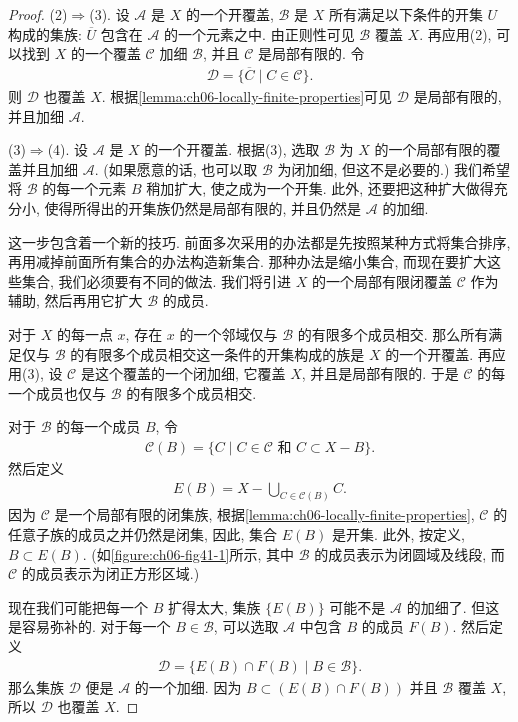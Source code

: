 \documentclass[../../main.tex]{subfiles}
\begin{document}
\begin{proof}
(2)$\Rightarrow$(3). 设 $\mathcal{A}$ 是 $X$ 的一个开覆盖, $\mathcal{B}$ 是 $X$ 所有满足以下条件的开集 $U$ 构成的集族: $\overline{U}$ 包含在 $\mathcal{A}$ 的一个元素之中. 由正则性可见 $\mathcal{B}$ 覆盖 $X$. 再应用(2), 可以找到 $X$ 的一个覆盖 $\mathcal{C}$ 加细 $\mathcal{B}$, 并且 $\mathcal{C}$ 是局部有限的. 令
\begin{align*}
\mathcal{D}=\{\overline{C}\mid C\in\mathcal{C}\}.
\end{align*}
则 $\mathcal{D}$ 也覆盖 $X$. 根据\cref{lemma:ch06-locally-finite-properties}可见 $\mathcal{D}$ 是局部有限的, 并且加细 $\mathcal{A}$.

(3)$\Rightarrow$(4). 设 $\mathcal{A}$ 是 $X$ 的一个开覆盖. 根据(3), 选取 $\mathcal{B}$ 为 $X$ 的一个局部有限的覆盖并且加细 $\mathcal{A}$. (如果愿意的话, 也可以取 $\mathcal{B}$ 为闭加细, 但这不是必要的.) 我们希望将 $\mathcal{B}$ 的每一个元素 $B$ 稍加扩大, 使之成为一个开集. 此外, 还要把这种扩大做得充分小, 使得所得出的开集族仍然是局部有限的, 并且仍然是 $\mathcal{A}$ 的加细.

这一步包含着一个新的技巧. 前面多次采用的办法都是先按照某种方式将集合排序, 再用减掉前面所有集合的办法构造新集合. 那种办法是缩小集合, 而现在要扩大这些集合, 我们必须要有不同的做法. 我们将引进 $X$ 的一个局部有限闭覆盖 $\mathcal{C}$ 作为辅助, 然后再用它扩大 $\mathcal{B}$ 的成员.

对于 $X$ 的每一点 $x$, 存在 $x$ 的一个邻域仅与 $\mathcal{B}$ 的有限多个成员相交. 那么所有满足仅与 $\mathcal{B}$ 的有限多个成员相交这一条件的开集构成的族是 $X$ 的一个开覆盖. 再应用(3), 设 $\mathcal{C}$ 是这个覆盖的一个闭加细, 它覆盖 $X$, 并且是局部有限的. 于是 $\mathcal{C}$ 的每一个成员也仅与 $\mathcal{B}$ 的有限多个成员相交.

对于 $\mathcal{B}$ 的每一个成员 $B$, 令
\begin{align*}
\mathcal{C}(B)=\{C\mid C\in\mathcal{C}\text{ 和 }C\subset X-B\}.
\end{align*}
然后定义
\begin{align*}
E(B)=X-\bigcup_{C\in\mathcal{C}(B)}C.
\end{align*}
因为 $\mathcal{C}$ 是一个局部有限的闭集族, 根据\cref{lemma:ch06-locally-finite-properties}, $\mathcal{C}$ 的任意子族的成员之并仍然是闭集, 因此, 集合 $E(B)$ 是开集. 此外, 按定义, $B\subset E(B)$. (如\cref{figure:ch06-fig41-1}所示, 其中 $\mathcal{B}$ 的成员表示为闭圆域及线段, 而 $\mathcal{C}$ 的成员表示为闭正方形区域.)


现在我们可能把每一个 $B$ 扩得太大, 集族 $\{E(B)\}$ 可能不是 $\mathcal{A}$ 的加细了. 但这是容易弥补的. 对于每一个 $B\in\mathcal{B}$, 可以选取 $\mathcal{A}$ 中包含 $B$ 的成员 $F(B)$. 然后定义
\begin{align*}
\mathcal{D}=\{E(B)\cap F(B)\mid B\in\mathcal{B}\}.
\end{align*}
那么集族 $\mathcal{D}$ 便是 $\mathcal{A}$ 的一个加细. 因为 $B\subset(E(B)\cap F(B))$ 并且 $\mathcal{B}$ 覆盖 $X$, 所以 $\mathcal{D}$ 也覆盖 $X$.


\end{proof}
\end{document}
